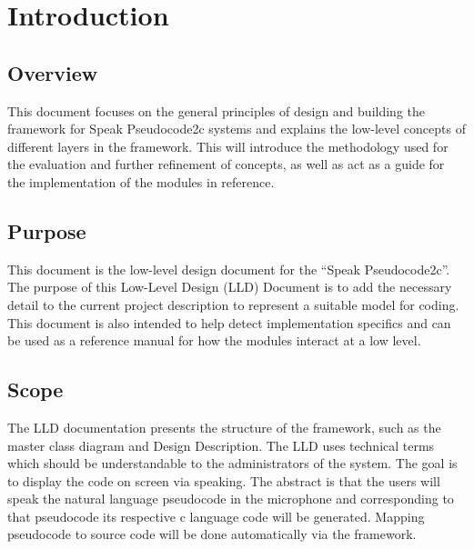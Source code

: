 \documentclass[12pt]{article}
\begin{document}




\tableofcontents

\newpage
{%
\let\oldnumberline\numberline%
\renewcommand{\numberline}{\figurename~\oldnumberline}%
\listoffigures%
}
{%
\let\oldnumberline\numberline%
\renewcommand{\numberline}{\tablename~\oldnumberline}%
\listoftables%
}


\newpage
\pagestyle{fancy}
\fancyhf{} 
\rfoot{\thepage}
\renewcommand{\headrulewidth}{0.6pt}
\renewcommand{\footrulewidth}{0.6pt}


\section{Introduction}
\subsection{Overview}
This document focuses on the general principles of design and building the framework for Speak Pseudocode2c systems and explains the low-level concepts of different layers in the framework. This will introduce the methodology used for the evaluation and further refinement of concepts, as well as act as a guide for the implementation of the modules in reference.

\subsection{Purpose}
This document is the low-level design document for the “Speak Pseudocode2c”. The purpose of this Low-Level Design (LLD) Document is to add the necessary detail to the current project description to represent a suitable model for coding. This document is also intended to help detect implementation specifics and can be used as a reference manual for how the modules interact at a low level.

\subsection{Scope}
The LLD documentation presents the structure of the framework, such as the master class diagram and Design Description. The LLD uses technical terms which should be understandable to the administrators of the system. The goal is to display the code on screen via speaking. The abstract is that the users will speak the natural language pseudocode in the microphone and corresponding to that pseudocode its respective c language code will be generated. Mapping pseudocode to source code will be done automatically via the framework.
\\
\end{document}
